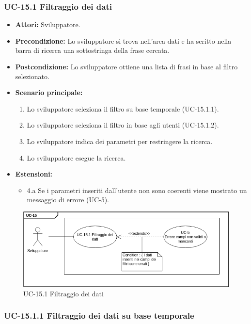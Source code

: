 	
	\subsubsection{UC-15.1 Filtraggio dei dati}	
		\begin{itemize}
			\item \textbf{Attori:} Sviluppatore.
			\item \textbf{Precondizione:} Lo sviluppatore si trova nell'area dati e ha scritto nella barra di ricerca una sottostringa della frase cercata.
			\item \textbf{Postcondizione:} Lo sviluppatore ottiene una lista di frasi in base al filtro selezionato.
			\item \textbf{Scenario principale:}
				\begin{enumerate}
					\item Lo sviluppatore seleziona il filtro su base temporale (UC-15.1.1).
					\item Lo sviluppatore seleziona il filtro in base agli utenti (UC-15.1.2).
					\item Lo sviluppatore indica dei parametri per restringere la ricerca.
					\item Lo sviluppatore esegue la ricerca.
				\end{enumerate}	
			\item \textbf{Estensioni:}
				\begin{itemize}
					\item 4.a Se i parametri inseriti dall'utente non sono coerenti viene mostrato un messaggio di errore (UC-5).
				\end{itemize}		
		\end{itemize}
	\begin{figure}[h]
			\centering
			\includegraphics[scale=0.7]{images/UC-15_1.png}
			\caption{UC-15.1 Filtraggio dei dati}
		\end{figure}	
	
	\subsubsection{UC-15.1.1 Filtraggio dei dati su base temporale}	
		
